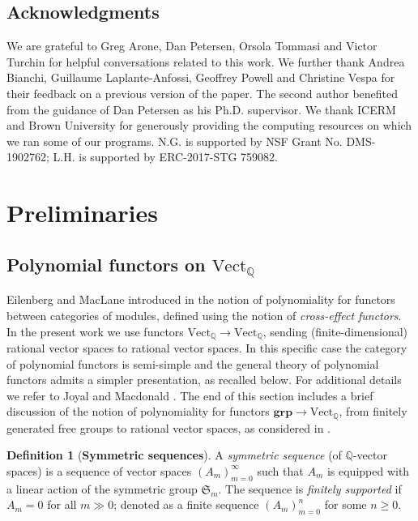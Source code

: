 \documentclass[12pt]{article}
\newcommand{\Q}{\mathbb{Q}}
\newcommand{\SymGroup}[1][n]{\mathfrak{S}_{#1}}
\newcommand{\Vect}[1]{\textrm{Vect}_{#1}}
\theoremstyle{plain}
\theoremstyle{definition}
\newtheorem{defi}[thm]{Definition}
\theoremstyle{remark}
\begin{document}
\subsection{Acknowledgments}
We are grateful to Greg Arone, Dan Petersen, Orsola Tommasi and Victor Turchin for helpful conversations related to this work. We further thank Andrea Bianchi, Guillaume Laplante-Anfossi, Geoffrey Powell and Christine Vespa for their feedback on a previous version of the paper.
The second author benefited from the guidance of Dan Petersen as his Ph.D. supervisor. We thank ICERM and Brown University for generously providing the computing resources on which we ran some of our programs.
N.G. is supported by NSF Grant No. DMS-1902762; L.H. is supported by ERC-2017-STG 759082.


\section{Preliminaries}
\subsection{Polynomial functors on \texorpdfstring{$\Vect{\Q}$}{VectQ}} \label{sec:prelim polynomial functors}

Eilenberg and MacLane introduced in \cite{EM54} the notion of polynomiality for functors between categories of modules, defined using the notion of \emph{cross-effect functors}.
In the present work we use functors $\Vect{\Q}\to\Vect{\Q}$, sending (finite-dimensional) rational vector spaces to rational vector spaces. In this specific case the category of polynomial functors is semi-simple and the general theory of polynomial functors admits a simpler presentation,  as recalled below. For additional details we refer to Joyal \cite{Joyal86} and Macdonald \cite[Appendix I.A]{MacDonald}.
The end of this section includes a brief discussion of the notion of polynomiality for functors $\bm{grp} \to \Vect{\Q}$, from finitely generated free groups to rational vector spaces, as considered in \cite{DV15}.

\begin{defi}[\textbf{Symmetric sequences}]
    A \emph{symmetric sequence} (of $\Q$-vector spaces) is a sequence of vector spaces $(A_m)_{m=0}^\infty$ such that $A_m$ is equipped with a linear action of the symmetric group $\SymGroup[m]$. The sequence is \emph{finitely supported} if $A_m=0$ for all $m\gg 0$; denoted as a finite sequence $(A_m)_{m=0}^n$ for some $n\geq 0$.
\end{defi}
\end{document}

